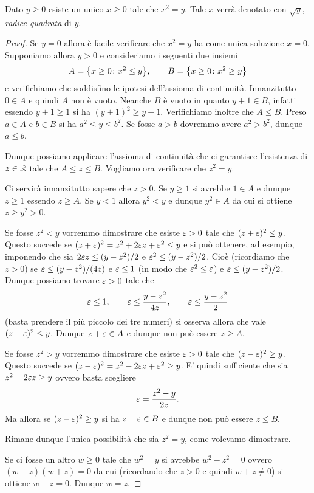 \begin{theorem}
\label{th:radice_quadrata}%
%
\mymark{***}%
Dato $y\ge 0$ esiste un unico $x\ge 0$ tale che $x^2=y$.
Tale $x$ verrà denotato con $\sqrt y$, \emph{radice quadrata} di $y$.
\mymargin{$\sqrt{\cdot}$}
\end{theorem}
\begin{proof}
\mymark{*}
Se $y=0$ allora è facile verificare che $x^2=y$ ha come unica soluzione $x=0$.
Supponiamo allora $y>0$ e
consideriamo i seguenti due insiemi
\[
  A = {\left\{ x\ge 0 \colon x^2 \le y \right\}},\qquad
  B = {\left\{ x\ge 0 \colon x^2 \ge y \right\}}
\]
e verifichiamo che soddisfino le ipotesi dell'assioma di continuità.
Innanzitutto $0\in A$ e quindi $A$ non è vuoto.
Neanche $B$ è vuoto in quanto $y+1\in B$,
infatti essendo $y+1\ge 1$ si ha
$(y+1)^2 \ge y+1$. Verifichiamo inoltre che $A \le B$.
Preso $a\in A$ e $b\in B$ si ha $a^2 \le y \le b^2$.
Se fosse $a>b$ dovremmo avere $a^2>b^2$, dunque $a \le b$.

Dunque possiamo applicare l'assioma di continuità
che ci garantisce l'esistenza di $z\in \mathbb R$ tale che $A \le z \le B$.
Vogliamo ora verificare che $z^2 = y$.

Ci servirà innanzitutto sapere che $z>0$. Se $y\ge 1$ si avrebbe $1\in A$
e dunque $z\ge 1$ essendo $z\ge A$. Se $y<1$ allora $y^2 < y$ e dunque $y^2 \in A$
da cui si ottiene $z\ge y^2 > 0$.

Se fosse $z^2 < y$ vorremmo dimostrare che esiste $\varepsilon>0$ tale che
$(z+\varepsilon)^2 \le y$.
Questo succede se $(z+\varepsilon)^2 = z^2 + 2 \varepsilon z + \varepsilon^2 \le y$
e si può ottenere, ad esempio,
imponendo che sia $2\varepsilon z \le (y-z^2)/2$ e $\varepsilon^2 \le (y-z^2)/2$.
Cioè (ricordiamo che $z>0$) se $\varepsilon \le (y-z^2)/(4z)$ e $\varepsilon \le 1$
(in modo che $\varepsilon^2 \le \varepsilon$)
e $\varepsilon \le (y-z^2)/2$. Dunque possiamo
trovare $\varepsilon>0$
tale che
\[
\varepsilon \le 1, \qquad
\varepsilon \le \frac{y-z^2}{4z}, \qquad
\varepsilon \le \frac{y-z^2}2
\]
(basta prendere il più piccolo dei tre numeri)
si osserva allora
che vale $(z+\varepsilon)^2\le y$.
Dunque $z+\varepsilon \in A$ e dunque non può essere $z\ge A$.

Se fosse $z^2 > y$ vorremmo dimostrare che esiste $\varepsilon>0$ tale che
$(z-\varepsilon)^2 \ge y$.
Questo succede se $(z-\varepsilon)^2 = z^2 - 2\varepsilon z + \varepsilon^2 \ge y$.
E' quindi sufficiente che sia $z^2 - 2 \varepsilon z \ge y$ ovvero basta scegliere
\[
  \varepsilon = \frac{z^2-y}{2z}.
\]
Ma allora se $(z-\varepsilon)^2\ge y$ si ha $z-\varepsilon \in B$ e dunque non può
essere $z \le B$.

Rimane dunque l'unica possibilità che sia $z^2 = y$, come volevamo dimostrare.

Se ci fosse un altro $w\ge 0$ tale che $w^2 = y$ si avrebbe $w^2 - z^2=0$ ovvero
$(w-z)(w+z)=0$ da cui (ricordando che $z>0$ e quindi $w+z\neq 0$)
si ottiene $w-z=0$. Dunque $w=z$.
\end{proof}

